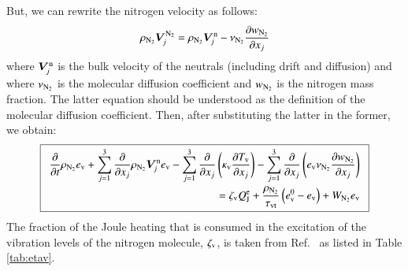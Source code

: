 \documentclass{warpdoc}
\newcommand\frameeqn[1]{\fbox{$\displaystyle #1$}}
\newcommand{\alb}{\vspace{0.1cm}\\} %
\newcommand{\mfd}{\displaystyle}
\newcommand{\ev}{{e_{\rm v}}}
\newcommand{\evzero}{{e_{\rm v}^0}}
\newcommand{\kappaev}{\kappa_{{\rm v}}}
\newcommand{\tauvt}{\tau_{\rm vt}}
\renewcommand{\vec}[1]{\bm{#1}}
\let\citen\cite
\begin{document}
But, we can rewrite the nitrogen velocity as follows:
%
\begin{equation}
 \rho_{\rm N_2} \vec{V}^{\rm N_2}_j =  \rho_{\rm N_2} \vec{V}^{\rm n}_j - \nu_{\rm N_2} \frac{\partial w_{\rm N_2}}{\partial x_j}
\end{equation}
%
where $\vec{V}_j^{\rm n}$ is the bulk velocity of the neutrals (including drift and diffusion) and where $\nu_{\rm N_2}$ is the molecular diffusion coefficient and $w_{\rm N_2}$ is the nitrogen mass fraction. The latter equation should be understood as the definition of the molecular diffusion coefficient. Then, after substituting the latter in the former, we obtain:
%
\begin{equation}
\frameeqn{
 \begin{array}{r}
  \mfd\frac{\partial}{\partial t} \rho_{\rm N_2} \ev
     + \sum_{j=1}^{3} \frac{\partial }{\partial x_j}
       \rho_{\rm N_2} \vec{V}^{\rm n}_j \ev
     - \sum_{j=1}^{3} \frac{\partial }{\partial x_j} \left(
            \kappaev  \frac{\partial T_{\rm v}}{\partial x_j}\right)
     - \sum_{j=1}^{3} \frac{\partial }{\partial x_j} \left(
            \ev \nu_{\rm N_2}  \frac{\partial w_{\rm N_2}}{\partial x_j}\right)\alb\mfd
 = 
 \zeta_{\rm v} Q_{\rm J}^{\rm e}   + {\frac{\rho_{\rm N_2}}{\tauvt}}\left( \evzero-\ev \right) + W_{\rm N_2} \ev
\end{array}
}
\label{eqn:ev2}
\end{equation}
%
The fraction of the Joule heating that is consumed in the excitation of the vibration levels of the nitrogen molecule, $\zeta_{\rm v}$,  is taken from Ref.\ \citen{misc:1981:aleksandrov} as listed in Table \ref{tab:etav}.
\end{document}
